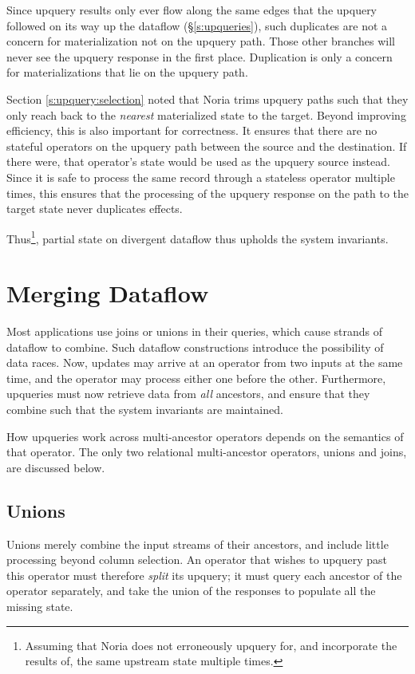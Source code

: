 Since upquery results only ever flow along the same edges that the upquery
followed on its way up the dataflow (\S\ref{s:upqueries}), such duplicates are
not a concern for materialization not on the upquery path. Those other branches
will never see the upquery response in the first place. Duplication is only a
concern for materializations that lie on the upquery path.

Section \ref{s:upquery:selection} noted that Noria trims upquery paths such that
they only reach back to the \emph{nearest} materialized state to the target.
Beyond improving efficiency, this is also important for correctness. It ensures
that there are no stateful operators on the upquery path between the source and
the destination. If there were, that operator's state would be used as the
upquery source instead. Since it is safe to process the same record through a
stateless operator multiple times, this ensures that the processing of the
upquery response on the path to the target state never duplicates effects.

Thus\footnote{Assuming that Noria does not erroneously upquery for, and
incorporate the results of, the same upstream state multiple times.}, partial
state on divergent dataflow thus upholds the system invariants.

\section{Merging Dataflow}
\label{s:partial:merging}

Most applications use joins or unions in their queries, which cause strands of
dataflow to combine. Such dataflow constructions introduce the possibility of
data races. Now, updates may arrive at an operator from two inputs at the same
time, and the operator may process either one before the other. Furthermore,
upqueries must now retrieve data from \emph{all} ancestors, and ensure that they
combine such that the system invariants are maintained.

How upqueries work across multi-ancestor operators depends on the semantics of
that operator. The only two relational multi-ancestor operators, unions and
joins, are discussed below.

\subsection{Unions}
\label{s:upqueries:union}

Unions merely combine the input streams of their ancestors, and include little
processing beyond column selection. An operator that wishes to upquery past this
operator must therefore \emph{split} its upquery; it must query each ancestor of
the operator separately, and take the union of the responses to populate all the
missing state.

